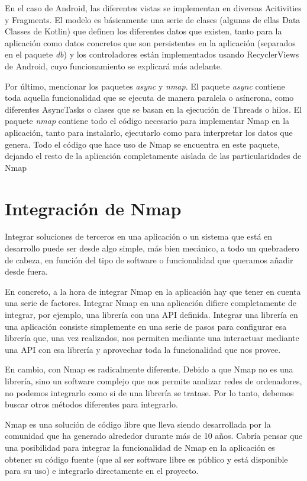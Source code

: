 En el caso de Android, las diferentes vistas se implementan en diversas Acitivities y Fragments. El modelo es básicamente una serie de clases (algunas de ellas Data Classes de Kotlin) que definen los diferentes datos que existen, tanto para la aplicación como datos concretos que son persistentes en la aplicación (separados en el paquete \textit{db}) y los controladores están implementados usando RecyclerViews de Android, cuyo funcionamiento se explicará más adelante.

Por último, mencionar los paquetes \textit{async} y \textit{nmap}. El paquete \textit{async} contiene toda aquella funcionalidad que se ejecuta de manera paralela o asíncrona, como diferentes AsyncTasks o clases que se basan en la ejecución de Threads o hilos. El paquete \textit{nmap} contiene todo el código necesario para implementar Nmap en la aplicación, tanto para instalarlo, ejecutarlo como para interpretar los datos que genera. Todo el código que hace uso de Nmap se encuentra en este paquete, dejando el resto de la aplicación completamente aislada de las particularidades de Nmap

\section{Integración de Nmap}

Integrar soluciones de terceros en una aplicación o un sistema que está en desarrollo puede ser desde algo simple, más bien mecánico, a todo un quebradero de cabeza, en función del tipo de software o funcionalidad que queramos añadir desde fuera.

En concreto, a la hora de integrar Nmap en la aplicación hay que tener en cuenta una serie de factores. Integrar Nmap en una aplicación difiere completamente de integrar, por ejemplo, una librería con una API definida. Integrar una librería en una aplicación consiste simplemente en una serie de pasos para configurar esa librería que, una vez realizados, nos permiten mediante una interactuar mediante una API con esa librería y aprovechar toda la funcionalidad que nos provee. 

En cambio, con Nmap es radicalmente diferente. Debido a que Nmap no es una librería, sino un software complejo que nos permite analizar redes de ordenadores, no podemos integrarlo como si de una librería se tratase. Por lo tanto, debemos buscar otros métodos diferentes para integrarlo.

Nmap es una solución de código libre que lleva siendo desarrollada por la comunidad que ha generado alrededor durante más de 10 años. Cabría pensar que una posibilidad para integrar la funcionalidad de Nmap en la aplicación es obtener su código fuente (que al ser software libre es público y está disponible para su uso) e integrarlo directamente en el proyecto.

